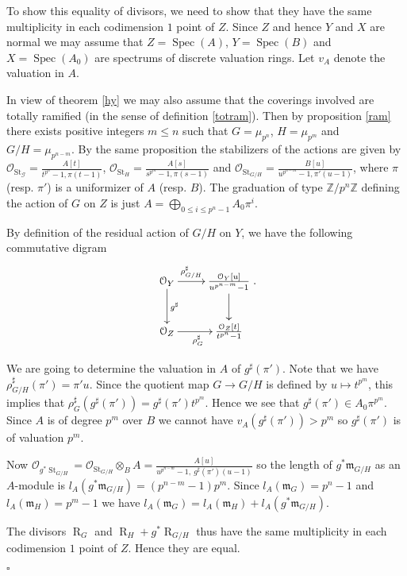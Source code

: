 \documentclass{amsart}
\newenvironment{demo}{{\flushleft \bf Proof~:}}{\hfill $\square$ \vspace{5mm}}
\theoremstyle{definition}
\theoremstyle{remark}
\begin{document}
\begin{demo}

To show this equality of divisors, we need to show that they have the same multiplicity in each codimension $1$ point of $Z$. Since $Z$ and hence $Y$ and $X$ are normal we may assume that $Z=\operatorname{Spec}(A)$, $Y=\operatorname{Spec}(B)$ and $X=\operatorname{Spec}(A_0)$ are spectrums of discrete valuation rings. Let $v_A$ denote the valuation in $A$.

In view of theorem \ref{hy} we may also assume that the coverings involved are totally ramified (in the sense of definition \ref{totram}). Then by proposition \ref{ram} there exists positive integers $m \leq n$ such that $G = \mu_{p^n}$, $H=\mu_{p^m}$ and $G/H = \mu_{p^{n-m}}$. By the same proposition the stabilizers of the actions are given by ${{\mathcal O}}_{\operatorname{St}_{{\mathcal G}}}= \frac{A[t]}{t^{p^n} -1,\pi(t-1)}$, ${{\mathcal O}}_{\operatorname{St}_H} = \frac{A[s]}{s^{p^m}-1,\pi(s-1)}$ and ${{\mathcal O}}_{\operatorname{St}_{G/H}} = \frac{B[u]}{u^{p^{n-m}}-1, \pi'(u-1)}$, where $\pi$ (resp. $\pi'$) is a uniformizer of $A$ (resp. $B$). The graduation of type ${\mathbb{Z}}/p^n {\mathbb{Z}}$ defining the action of $G$ on $Z$ is just $A = \displaystyle\bigoplus_{0 \leq i \leq p^n-1} A_0 \pi^i$. 

By definition of the residual action of $G/H$ on $Y$, we have the following commutative digram \[\xymatrix{{{\mathcal O}}_Y \ar[r]^-{\rho_{G/H}^\sharp} \ar[d]^{g^\sharp} & \frac{{{\mathcal O}}_Y[u]}{u^{p^{n-m}}-1} \ar[d] \\ {{\mathcal O}}_Z \ar[r]_{\rho_G^\sharp} & \frac{{{\mathcal O}}_Z[t]}{t^{p^n}-1}}. \]

We are going to determine the valuation in $A$ of $g^\sharp(\pi')$.
Note that we have $\rho_{G/H}^\sharp(\pi') = \pi'u$. Since the quotient map $G {\longrightarrow} G/H$ is defined by $u \mapsto t^{p^m}$, this implies that $\rho_G^\sharp(g^\sharp(\pi')) = g^\sharp(\pi')t^{p^m}$. Hence we see that $g^\sharp(\pi') \in A_0 \pi^{p^m}$. Since $A$ is of degree $p^m$ over $B$ we cannot have $v_A(   g^\sharp(\pi')) > p^m$ so $g^\sharp(\pi')$ is of valuation $p^m$.

Now ${{\mathcal O}}_{g^*\operatorname{St}_{G/H}} = {{\mathcal O}}_{\operatorname{St}_{G/H}} \otimes_B A = \frac{A[u]}{u^{p^{n-m}}-1, \ g^\sharp(\pi')(u-1)}$ so the length of $g^*{{\mathfrak m}}_{G/H}$ as an $A$-module is $l_A(g^* {{\mathfrak m}}_{G/H}) = (p^{n-m}-1)p^m$. Since $l_A({{\mathfrak m}}_G) = p^n-1$ and $l_A({{\mathfrak m}}_H) = p^m-1$ we have $l_A({{\mathfrak m}}_G) = l_A({{\mathfrak m}}_H) + l_A(g^*{{\mathfrak m}}_{G/H})$.

\medskip
The divisors $\operatorname{R}_G$ and $\operatorname{R}_H + g^*\operatorname{R}_{G/H}$ thus have the same multiplicity in each codimension $1$ point of $Z$. Hence they are equal.

\end{demo}
\end{document}
